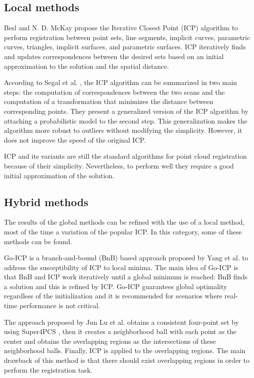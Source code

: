         \subsection{Local methods}

        Besl and N. D. McKay \cite{Besl_1992_amethod} propose the Iterative Closest Point (ICP) algorithm to perform registration 
        between point sets, line segments, implicit curves, parametric curves, triangles, implicit surfaces, and parametric surfaces.
        ICP iteratively finds and updates correspondences between the desired sets based on an initial approximation to the solution and 
        the spatial distance.

        According to Segal et al. \cite{Segal_2009_generalizedicp}, the ICP algorithm can be summarized in two main steps:
        the computation of correspondences between the two scans and 
        the computation of a transformation that minimizes the distance between corresponding points.
        They present a generalized version of the ICP algorithm by attaching a probabilistic model to the second step.
        This generalization makes the algorithm more robust to outliers without modifying the simplicity. 
        However, it does not improve the speed of the original ICP.

        ICP and its variants are still the standard algorithms for point cloud registration because of their simplicity. 
        Nevertheless, to perform well they require a good initial approximation of the solution.

        \subsection{Hybrid methods}

        The results of the global methods can be refined with the use of a local method, most of the time a variation of the popular ICP.
        In this category, some of these methods can be found.

        Go-ICP is a branch-and-bound (BnB) based approach proposed by Yang et al. \cite{Yang_2016_goicp} to address the susceptibility of ICP to local minima. 
        The main idea of Go-ICP is that BnB and ICP work iteratively until a global minimum is reached: BnB finds a solution and this is refined by ICP.
        Go-ICP guarantees global optimality regardless of the initialization and it is recommended for scenarios where real-time performance is not critical.

        The approach proposed by Jun Lu et al. \cite{Lu_2019_4pcsicp} obtains a consistent four-point set by using Super4PCS \cite{Mellado_2014_super4pcs}, 
        then it creates a neighborhood ball with each point as the center and obtains the overlapping regions as the intersections
        of these neighborhood balls. Finally, ICP is applied to the overlapping regions. The main drawback of this method is that 
        there should exist overlapping regions in order to perform the registration task.

